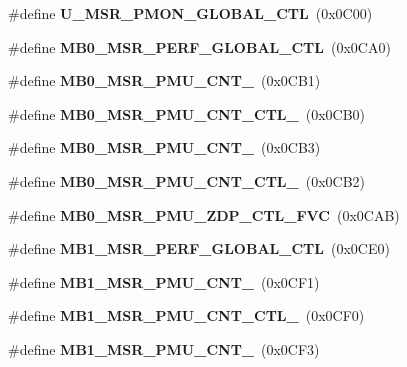 \begin{DoxyCompactItemize}
\item 
\#define {\bfseries U\+\_\+\+M\+S\+R\+\_\+\+P\+M\+O\+N\+\_\+\+G\+L\+O\+B\+A\+L\+\_\+\+C\+TL}~(0x0\+C00)\label{types_8h_a1c69439681fa91a8823350ce9ad91262}

\item 
\#define {\bfseries M\+B0\+\_\+\+M\+S\+R\+\_\+\+P\+E\+R\+F\+\_\+\+G\+L\+O\+B\+A\+L\+\_\+\+C\+TL}~(0x0\+C\+A0)\label{types_8h_a00d8e56a55456b4f7eaa0721e3a92554}

\item 
\#define {\bfseries M\+B0\+\_\+\+M\+S\+R\+\_\+\+P\+M\+U\+\_\+\+C\+N\+T\+\_}~(0x0\+C\+B1)\label{types_8h_af5040cf21905f48c937b0136ec430913}

\item 
\#define {\bfseries M\+B0\+\_\+\+M\+S\+R\+\_\+\+P\+M\+U\+\_\+\+C\+N\+T\+\_\+\+C\+T\+L\+\_}~(0x0\+C\+B0)\label{types_8h_ae4a0e1983c4493471b78c7b3d4bc7f46}

\item 
\#define {\bfseries M\+B0\+\_\+\+M\+S\+R\+\_\+\+P\+M\+U\+\_\+\+C\+N\+T\+\_}~(0x0\+C\+B3)\label{types_8h_a0df6e3fab87e53401d50c45c4555974c}

\item 
\#define {\bfseries M\+B0\+\_\+\+M\+S\+R\+\_\+\+P\+M\+U\+\_\+\+C\+N\+T\+\_\+\+C\+T\+L\+\_}~(0x0\+C\+B2)\label{types_8h_ae39dc86d20e7a32716317b09034a3f15}

\item 
\#define {\bfseries M\+B0\+\_\+\+M\+S\+R\+\_\+\+P\+M\+U\+\_\+\+Z\+D\+P\+\_\+\+C\+T\+L\+\_\+\+F\+VC}~(0x0\+C\+A\+B)\label{types_8h_a53e14a771731731a3f3a860c4eef80f7}

\item 
\#define {\bfseries M\+B1\+\_\+\+M\+S\+R\+\_\+\+P\+E\+R\+F\+\_\+\+G\+L\+O\+B\+A\+L\+\_\+\+C\+TL}~(0x0\+C\+E0)\label{types_8h_a8aaf763a5f24ae67e344355e5e29b1d9}

\item 
\#define {\bfseries M\+B1\+\_\+\+M\+S\+R\+\_\+\+P\+M\+U\+\_\+\+C\+N\+T\+\_}~(0x0\+C\+F1)\label{types_8h_a81d488eaa84dfb353d4efcf2b1e20081}

\item 
\#define {\bfseries M\+B1\+\_\+\+M\+S\+R\+\_\+\+P\+M\+U\+\_\+\+C\+N\+T\+\_\+\+C\+T\+L\+\_}~(0x0\+C\+F0)\label{types_8h_a3b528747d7aa55a42ec7e67955157d44}

\item 
\#define {\bfseries M\+B1\+\_\+\+M\+S\+R\+\_\+\+P\+M\+U\+\_\+\+C\+N\+T\+\_}~(0x0\+C\+F3)\label{types_8h_add7e5a997296911b1eeef0d72990217e}


\end{DoxyCompactItemize}
